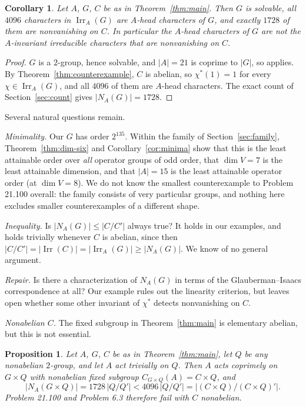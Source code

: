 \documentclass[11pt]{article}
\newtheorem{proposition}[theorem]{Proposition}
\newtheorem{corollary}[theorem]{Corollary}
\theoremstyle{definition}
\theoremstyle{remark}
\newcommand{\Irr}{\operatorname{Irr}}
\begin{document}
\begin{corollary}\label{cor:head}
Let $A$, $G$, $C$ be as in Theorem~\ref{thm:main}.  Then $G$ is
solvable, all $4096$ characters in $\Irr_A(G)$ are $A$-head characters
of $G$, and exactly $1728$ of them are nonvanishing on $C$.  In
particular the $A$-head characters of $G$ are not the $A$-invariant
irreducible characters that are nonvanishing on $C$.
\end{corollary}

\begin{proof}
$G$ is a $2$-group, hence solvable, and $|A|=21$ is coprime to $|G|$, so
\cite[Theorem 7.1]{isaacs-carter} applies.  By
Theorem~\ref{thm:counterexample}, $C$ is abelian, so $\chi^*(1)=1$ for
every $\chi\in\Irr_A(G)$, and all $4096$ of them are $A$-head characters.
The exact count of Section~\ref{sec:count} gives $|N_A(G)|=1728$.
\end{proof}

Several natural questions remain.

\emph{Minimality.} Our $G$ has order $2^{135}$.  Within the family of
Section~\ref{sec:family}, Theorem~\ref{thm:dim-six} and
Corollary~\ref{cor:minima} show that this is the least attainable
order over \emph{all} operator groups of odd order, that $\dim V=7$ is
the least attainable dimension, and that $|A|=15$ is the least
attainable operator order (at $\dim V=8$).  We do not know the
smallest counterexample to Problem 21.100 overall: the family consists
of very particular groups, and nothing here excludes smaller
counterexamples of a different shape.

\emph{Inequality.} Is $|N_A(G)|\le|C/C'|$ always true?  It holds in our
examples, and holds trivially whenever $C$ is abelian, since then
$|C/C'|=|\Irr(C)|=|\Irr_A(G)|\ge|N_A(G)|$.  We know of no general
argument.

\emph{Repair.} Is there a characterization of $N_A(G)$ in terms of the
Glauberman--Isaacs correspondence at all?  Our example rules out the
linearity criterion, but leaves open whether some other invariant of
$\chi^*$ detects nonvanishing on $C$.

\emph{Nonabelian $C$.} The fixed subgroup in Theorem~\ref{thm:main} is
elementary abelian, but this is not essential.

\begin{proposition}\label{prop:nonabelian-C}
Let $A$, $G$, $C$ be as in Theorem~\ref{thm:main}, let $Q$ be any
nonabelian $2$-group, and let $A$ act trivially on $Q$.  Then $A$ acts
coprimely on $G\times Q$ with nonabelian fixed subgroup
$C_{G\times Q}(A)=C\times Q$, and
\[
 |N_A(G\times Q)|=1728\,|Q/Q'|
 <4096\,|Q/Q'|=|(C\times Q)/(C\times Q)'| .
\]
Problem 21.100 and Problem 6.3 therefore fail with $C$ nonabelian.
\end{proposition}
\end{document}
